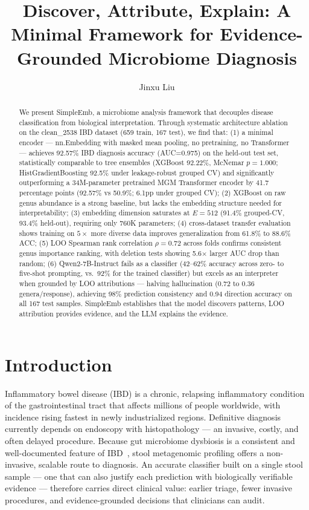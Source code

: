 \documentclass[11pt,a4paper]{article}
\title{Discover, Attribute, Explain: A Minimal Framework for Evidence-Grounded Microbiome Diagnosis}
\author{Jinxu Liu}
\date{}
\begin{document}
\maketitle

\begin{abstract}
We present SimpleEmb, a microbiome analysis framework that decouples disease classification from biological interpretation. Through systematic architecture ablation on the clean\_2538 IBD dataset (659 train, 167 test), we find that: (1) a minimal encoder --- nn.Embedding with masked mean pooling, no pretraining, no Transformer --- achieves 92.57\% IBD diagnosis accuracy (AUC=0.975) on the held-out test set, statistically comparable to tree ensembles (XGBoost 92.22\%, McNemar $p{=}1.000$; HistGradientBoosting 92.5\% under leakage-robust grouped CV) and significantly outperforming a 34M-parameter pretrained MGM Transformer encoder by 41.7 percentage points (92.57\% vs 50.9\%; 6.1pp under grouped CV); (2) XGBoost on raw genus abundance is a strong baseline, but lacks the embedding structure needed for interpretability; (3) embedding dimension saturates at $E{=}512$ (91.4\% grouped-CV, 93.4\% held-out), requiring only 760K parameters; (4) cross-dataset transfer evaluation shows training on $5\times$ more diverse data improves generalization from 61.8\% to 88.6\% ACC; (5) LOO Spearman rank correlation $\rho{=}0.72$ across folds confirms consistent genus importance ranking, with deletion tests showing 5.6$\times$ larger AUC drop than random; (6) Qwen2-7B-Instruct fails as a classifier (42--62\% accuracy across zero- to five-shot prompting, vs.\ 92\% for the trained classifier) but excels as an interpreter when grounded by LOO attributions --- halving hallucination (0.72 to 0.36 genera/response), achieving 98\% prediction consistency and 0.94 direction accuracy on all 167 test samples. SimpleEmb establishes that the model discovers patterns, LOO attribution provides evidence, and the LLM explains the evidence.
\end{abstract}

\section{Introduction}

Inflammatory bowel disease (IBD) is a chronic, relapsing inflammatory condition of the gastrointestinal tract that affects millions of people worldwide, with incidence rising fastest in newly industrialized regions. Definitive diagnosis currently depends on endoscopy with histopathology --- an invasive, costly, and often delayed procedure. Because gut microbiome dysbiosis is a consistent and well-documented feature of IBD~\cite{paidimarri2024}, stool metagenomic profiling offers a non-invasive, scalable route to diagnosis. An accurate classifier built on a single stool sample --- one that can also justify each prediction with biologically verifiable evidence --- therefore carries direct clinical value: earlier triage, fewer invasive procedures, and evidence-grounded decisions that clinicians can audit.
\end{document}
